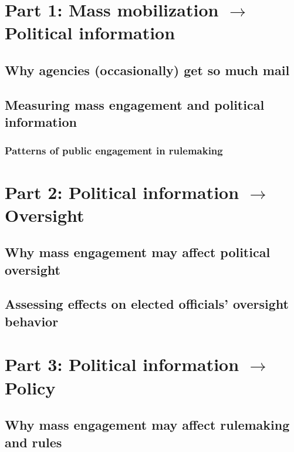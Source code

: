 \documentclass{article}
\begin{document}
\section{Part 1: Mass mobilization $\rightarrow$ Political information}
\subsection{Why agencies (occasionally) get so much mail} \label{whymail-intro}



\subsection{Measuring mass engagement and political information}
\label{whyMail-methods}

\subsubsection{Patterns of public engagement in rulemaking}
\label{whyMail-results}


\section{Part 2: Political information $\rightarrow$ Oversight}
\subsection{Why mass engagement may affect political oversight} \label{principals-intro}


\subsection{Assessing effects on elected officials' oversight behavior} \label{principals-methods}


\section{Part 3: Political information $\rightarrow$ Policy}
\subsection{Why mass engagement may affect rulemaking and rules} \label{influence-intro}


% 
\end{document}
